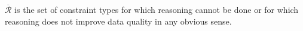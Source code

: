 \documentclass{acm_proc_article-sp}
\newcommand{\ms}[1]{%
  \texttt{#1}
}
\newenvironment{DL}{
  \vspace{0cm}
  \begin{tabular}{l l}

}{
  \end{tabular}
}
\begin{document}
$\overline{\mathcal{R}}$ is the set of constraint types for which reasoning cannot be done or 
for which reasoning does not improve data quality in any obvious sense.
%
%
%
\end{document}
